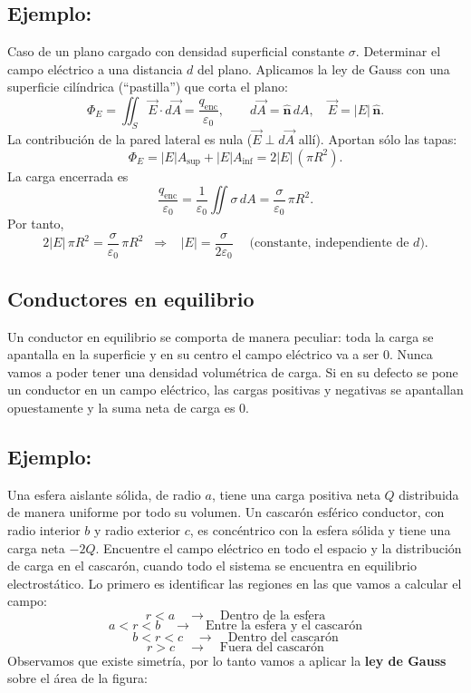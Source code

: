 \documentclass[a4paper,12pt]{article}
\begin{document}
\subsection*{Ejemplo:}
\noindent
Caso de un plano cargado con densidad superficial constante \(\sigma\). Determinar el campo eléctrico a una distancia \(d\) del plano. Aplicamos la ley de Gauss con una superficie cilíndrica (“pastilla”) que corta el plano:
\[
\Phi_E=\iint_{S}\vec E\!\cdot d\vec A=\frac{q_{\text{enc}}}{\varepsilon_0},
\qquad
d\vec A=\hat{\mathbf n}\,dA,\quad \vec E=|\!E|\,\hat{\mathbf n}.
\]
La contribución de la pared lateral es nula (\(\vec E\perp d\vec A\) allí). Aportan sólo las tapas:
\[
\Phi_E=|\!E|A_{\text{sup}}+|\!E|A_{\text{inf}}
=2|\!E|\,(\pi R^{2}).
\]
La carga encerrada es
\[
\frac{q_{\text{enc}}}{\varepsilon_0}
=\frac{1}{\varepsilon_0}\iint \sigma\,dA
=\frac{\sigma}{\varepsilon_0}\,\pi R^{2}.
\]
Por tanto,
\[
2|\!E|\,\pi R^{2}=\frac{\sigma}{\varepsilon_0}\,\pi R^{2}
\;\;\Longrightarrow\;\;
\boxed{\;|\!E|=\dfrac{\sigma}{2\varepsilon_0}\;}
\quad\text{(constante, independiente de \(d\)).}
\]
\subsection{Conductores en equilibrio}
\noindent
Un conductor en equilibrio se comporta de manera peculiar: toda la carga se apantalla en la superficie y en su centro el campo eléctrico va a ser $0$.
\noindent
Nunca vamos a poder tener una densidad volumétrica de carga.
\noindent
Si en su defecto se pone un conductor en un campo eléctrico, las cargas positivas y negativas se apantallan opuestamente y la suma neta de carga es $0$.

\subsection*{Ejemplo:}
\noindent
Una esfera aislante sólida, de radio $a$, tiene una carga positiva neta $Q$ distribuida de manera uniforme por todo su volumen.  
Un cascarón esférico conductor, con radio interior $b$ y radio exterior $c$, es concéntrico con la esfera sólida y tiene una carga neta $-2Q$.  
Encuentre el campo eléctrico en todo el espacio y la distribución de carga en el cascarón, cuando todo el sistema se encuentra en equilibrio electrostático.
\newpage
\noindent
Lo primero es identificar las regiones en las que vamos a calcular el campo:
\[
r < a \quad \rightarrow \quad \text{Dentro de la esfera}
\]
\[
a < r < b \quad \rightarrow \quad \text{Entre la esfera y el cascarón}
\]
\[
b < r < c \quad \rightarrow \quad \text{Dentro del cascarón}
\]
\[
r > c \quad \rightarrow \quad \text{Fuera del cascarón}
\]
Observamos que existe simetría, por lo tanto vamos a aplicar la \textbf{ley de Gauss} sobre el área de la figura:
\end{document}

